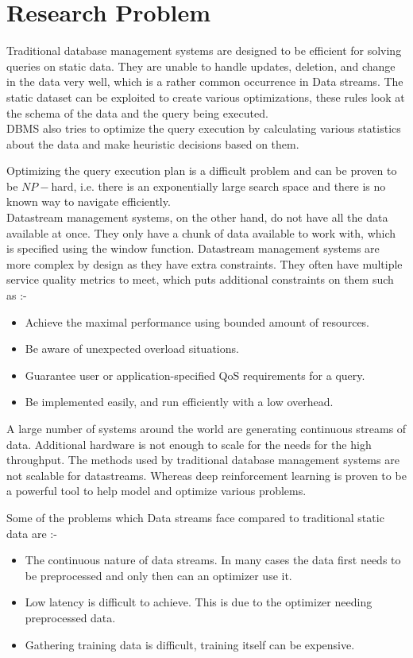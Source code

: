 \section{Research Problem}
\label{sec:Problem at hand}
Traditional database management systems are designed to be efficient for solving queries on static data. They are unable to handle updates, deletion, and change in the data very well, which is a rather common occurrence in Data streams. The static dataset can be exploited to create various optimizations, these rules look at the schema of the data and the query being executed.\\
DBMS also tries to optimize the query execution by calculating various statistics about the data and make heuristic decisions based on them.    
\par Optimizing the query execution plan is a difficult problem and can be proven to be $NP-$hard, i.e. there is an exponentially large search space and there is no known way to navigate efficiently.\\
Datastream management systems, on the other hand, do not have all the data available at once. They only have a chunk of data available to work with, which is specified using the window function. Datastream management systems are more complex by design as they have extra constraints. They often have multiple service quality metrics to meet, which puts additional constraints on them such as \cite{stream_optimization} :-
\begin{itemize}
    \item Achieve the maximal performance using bounded amount of resources.
    \item Be aware of unexpected overload situations.
    \item Guarantee user or application-specified QoS requirements for a query.
    \item Be implemented easily, and run efficiently with a low overhead.
\end{itemize}
\par A large number of systems around the world are generating continuous streams of data. Additional hardware is not enough to scale for the needs for the high throughput. The methods used by traditional database management systems are not scalable for datastreams. Whereas deep reinforcement learning is proven to be a powerful tool to help model and optimize various problems.
\par Some of the problems which Data streams face compared to traditional static data are \cite{stream_optimization}:-
\begin{itemize}
    \item The continuous nature of data streams. In many cases the data first needs to be preprocessed and only then can an optimizer use it.
    \item Low latency is difficult to achieve. This is due to the optimizer needing preprocessed data.
    \item Gathering training data is difficult, training itself can be expensive.
\end{itemize}

